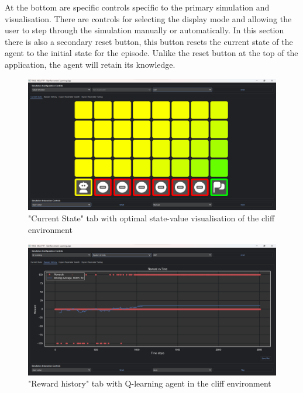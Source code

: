 \documentclass[]{final_report}
\begin{document}
At the bottom are specific controls specific to the primary simulation and visualisation. There are controls for selecting the display mode and allowing the user to step through the simulation manually or automatically. In this section there is also a secondary reset button, this button resets the current state of the agent to the initial state for the episode. Unlike the reset button at the top of the application, the agent will retain its knowledge.


\begin{figure}[H]
  \centering
  
  \includegraphics[trim={0 0 0 6mm},clip,width=\textwidth]{ui-screenshots/state-value-2.png}
  
  \caption{\label{fig:screenshot:current-state} "Current State" tab with optimal state-value visualisation of the cliff environment}
\end{figure}

\begin{figure}[H]
  \centering
  
  \includegraphics[trim={0 0 0 6mm},clip,width=\textwidth]{ui-screenshots/reward-history.png}
  
  \caption{\label{fig:screenshot:current-state} "Reward history" tab with Q-learning agent in the cliff environment}
\end{figure}
\end{document}
